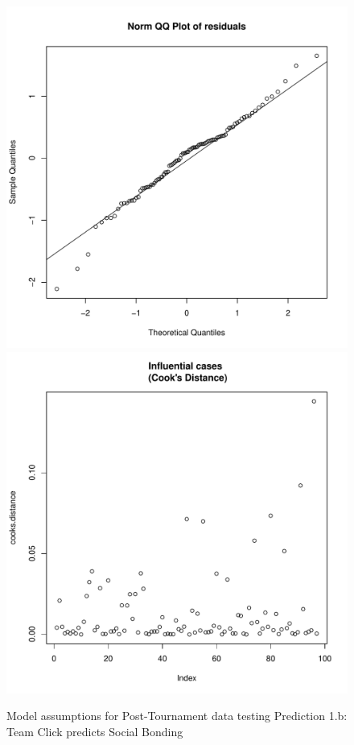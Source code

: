 \begin{CJK}{UTF8}{gbsn}
\begin{figure}[htbp]
                \includegraphics[scale =.4]{images/MLM2aQQNorm.pdf}
                \includegraphics[scale =.4]{images/MLM2aCooksD.pdf}
                \caption{Model assumptions for Post-Tournament data testing Prediction 1.b: Team Click predicts Social Bonding}
                \label{fig:MLM2aAssumptions}
              \end{figure}





\end{CJK}
